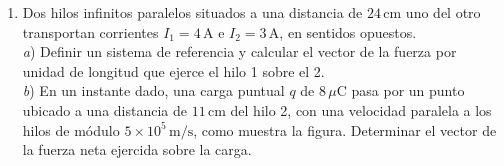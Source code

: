 \documentclass[a4paper,11pt,dvipsnames, twocolumn]{article}
\begin{document}
\begin{enumerate}[wide, labelwidth=2pt, labelindent=0pt]
\begin{center}
\end{center}

\vspace{3cm}

\item Dos hilos infinitos paralelos situados a una distancia de $24\,\text{cm}$ uno del otro transportan corrientes $I_1 = 4\,\text{A}$ e $I_2 = 3\,\text{A}$, en sentidos opuestos.\\
\textit{a}) Definir un sistema de referencia y calcular el vector de la fuerza por unidad de longitud que ejerce el hilo 1 sobre el 2.\\
\textit{b}) En un instante dado, una carga puntual $q$ de $8\,\mu\text{C}$ pasa por un punto ubicado a una distancia de $11\,\text{cm}$ del hilo 2, con una velocidad paralela a los hilos de módulo $5\times 10^5\,\text{m/s}$, como muestra la figura. Determinar el vector de la fuerza neta ejercida sobre la carga.


\end{enumerate}
\end{document}
